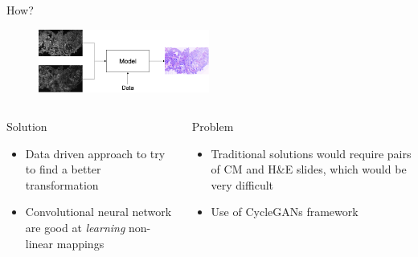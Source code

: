 \documentclass[t]{beamer}
\begin{document}
\begin{frame}{How?}

\begin{figure}
\centering
\includegraphics[width=0.5\textwidth]{transformation}
\end{figure}

\begin{columns}

\begin{column}{0.5\textwidth}
\begin{block}{Solution}
\begin{itemize}
\item<1-> Data driven approach to try to find a better transformation
\item<2-> Convolutional neural network are good at \emph{learning} non-linear mappings
\end{itemize}
\end{block}
\end{column}

\begin{column}{0.5\textwidth}
\begin{alertblock}{Problem}
\begin{itemize}
\item<3-> Traditional solutions would require pairs of CM and H\&E slides, which would be very difficult
\item<4-> Use of CycleGANs framework
\end{itemize}
\end{alertblock}
\end{column}


\end{columns}

\end{frame}
\end{document}
